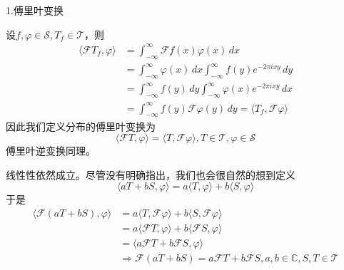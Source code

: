 \documentclass{ctexbook}
\begin{document}
\noindent 1.傅里叶变换

设$f,\varphi\in\mathcal{S} ,T_f\in\mathcal{T} $，则
\begin{align*}
    \langle\mathcal{F}T_f,\varphi\rangle & =\int_{-\infty}^{\infty}\mathcal{F}f(x)\varphi(x)\,dx                                       \\
                                         & =\int_{-\infty}^{\infty}\varphi(x)\,dx\int_{-\infty}^{\infty}f(y)e^{-2\pi ixy}\,dy          \\
                                         & =\int_{-\infty}^{\infty}f(y)\,dy\int_{-\infty}^{\infty}\varphi(x)e^{-2\pi ixy}\,dx          \\
                                         & =\int_{-\infty}^{\infty}f(y)\mathcal{F}\varphi(y)\,dy=\langle T_f,\mathcal{F}\varphi\rangle
\end{align*}
因此我们定义分布的傅里叶变换为
\begin{equation}
    \langle\mathcal{F}T,\varphi\rangle=\langle T,\mathcal{F}\varphi\rangle,T\in\mathcal{T} ,\varphi\in\mathcal{S}
\end{equation}
傅里叶逆变换同理。

线性性依然成立。尽管没有明确指出，我们也会很自然的想到定义
\begin{equation}
    \langle aT+bS,\varphi\rangle=a\langle T,\varphi\rangle+b\langle S,\varphi\rangle
\end{equation}
于是\begin{align*}
    \langle \mathcal{F} (aT+bS),\varphi\rangle & =a\langle T,\mathcal{F} \varphi\rangle+b\langle S,\mathcal{F} \varphi\rangle                     \\
                                               & =a\langle \mathcal{F} T,\varphi\rangle+b\langle \mathcal{F} S,\varphi\rangle                     \\
                                               & =\langle a\mathcal{F} T+b\mathcal{F} S,\varphi\rangle                                            \\
                                               & \Rightarrow \mathcal{F} (aT+bS)=a\mathcal{F} T+b\mathcal{F} S,a,b\in\mathbb{C},S,T\in\mathcal{T}
\end{align*}
\end{document}
